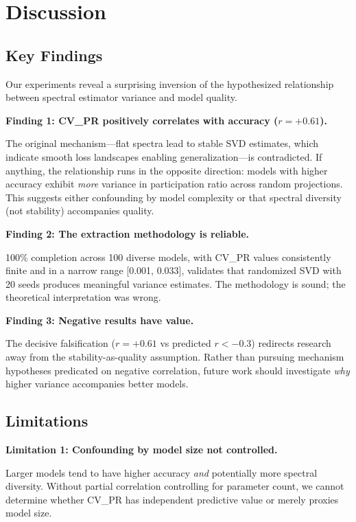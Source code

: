 \section{Discussion}
\label{sec:discussion}

\subsection{Key Findings}

Our experiments reveal a surprising inversion of the hypothesized relationship between spectral estimator variance and model quality.

\textbf{Finding 1: CV\_PR positively correlates with accuracy ($r = +0.61$).}

The original mechanism---flat spectra lead to stable SVD estimates, which indicate smooth loss landscapes enabling generalization---is contradicted. If anything, the relationship runs in the opposite direction: models with higher accuracy exhibit \emph{more} variance in participation ratio across random projections. This suggests either confounding by model complexity or that spectral diversity (not stability) accompanies quality.

\textbf{Finding 2: The extraction methodology is reliable.}

100\% completion across 100 diverse models, with CV\_PR values consistently finite and in a narrow range [0.001, 0.033], validates that randomized SVD with 20 seeds produces meaningful variance estimates. The methodology is sound; the theoretical interpretation was wrong.

\textbf{Finding 3: Negative results have value.}

The decisive falsification ($r = +0.61$ vs predicted $r < -0.3$) redirects research away from the stability-as-quality assumption. Rather than pursuing mechanism hypotheses predicated on negative correlation, future work should investigate \emph{why} higher variance accompanies better models.

\subsection{Limitations}

\textbf{Limitation 1: Confounding by model size not controlled.}

Larger models tend to have higher accuracy \emph{and} potentially more spectral diversity. Without partial correlation controlling for parameter count, we cannot determine whether CV\_PR has independent predictive value or merely proxies model size.

